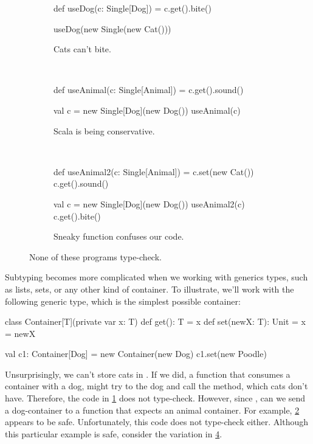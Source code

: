 \documentclass{book}
\begin{document}
\begin{figure}
\begin{subfigure}[b]{0.26\textwidth}
\begin{scalacode}
def useDog(c: Single[Dog]) = {
  c.get().bite()
}

useDog(new Single(new Cat()))
\end{scalacode}
\caption{Cats can't bite.}
\label{catdog1}
\end{subfigure}
~\vrule~
\begin{subfigure}[b]{0.33\textwidth}
\begin{scalacode}
def useAnimal(c: Single[Animal]) = {
  c.get().sound()
}

val c = new Single[Dog](new Dog())
useAnimal(c)
\end{scalacode}
\label{catdog2}
\caption{Scala is being conservative.}
\end{subfigure}
~\vrule~
\begin{subfigure}[b]{0.31\textwidth}
\begin{scalacode}
def useAnimal2(c: Single[Animal]) = {
  c.set(new Cat())
  c.get().sound()
}

val c = new Single[Dog](new Dog())
useAnimal2(c)
c.get().bite()
\end{scalacode}
\label{catdog3}
\caption{Sneaky function confuses our code.}
\end{subfigure}
\caption{None of these programs type-check.}
\end{figure}

Subtyping becomes more complicated when we working with generics types, such
as lists, sets, or any other kind of container. To illustrate, we'll work
with the following generic type, which is the simplest possible container:
%
\begin{scalacode}
class Container[T](private var x: T) {
  def get(): T = x
  def set(newX: T): Unit = x = newX
}

val c1: Container[Dog] = new Container(new Dog)
c1.set(new Poodle)
\end{scalacode}

Unsurprisingly, we can't store cats in . If we did, a function
that consumes a container with a dog, might try to  the
dog and call the  method, which cats don't have.
Therefore, the code in \cref{catdog1} does not type-check.
However, since , can we send a dog-container
to a function that expects an animal container. For example, \cref{catdog2}
appears to be safe. Unfortunately, this code does not type-check either. Although this particular example
is safe, consider the variation in \cref{catdog3}.
\end{document}
